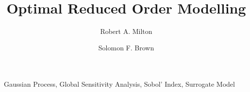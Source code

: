 \documentclass[preprint,12pt]{elsarticle}
\begin{document}
    \begin{frontmatter}



        \title{Optimal Reduced Order Modelling}

        
        \author{Robert A. Milton}

        \author{Solomon F. Brown}

        \address{Department of Chemical and Biological Engineering, University of Sheffield, Sheffield, S1 3JD, United Kingdom}       

        \begin{abstract}

        \end{abstract}

        \begin{keyword}
            Gaussian Process, Global Sensitivity Analysis, Sobol' Index, Surrogate Model



        \end{keyword}

    \end{frontmatter}
\end{document}
